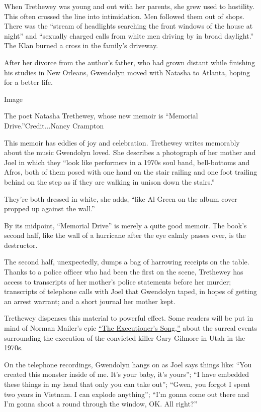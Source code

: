 When Trethewey was young and out with her parents, she grew used to
hostility. This often crossed the line into intimidation. Men followed
them out of shops. There was the ``stream of headlights searching the
front windows of the house at night'' and ``sexually charged calls from
white men driving by in broad daylight.'' The Klan burned a cross in the
family's driveway.

After her divorce from the author's father, who had grown distant while
finishing his studies in New Orleans, Gwendolyn moved with Natasha to
Atlanta, hoping for a better life.

Image

The poet Natasha Trethewey, whose new memoir is ``Memorial
Drive.''Credit...Nancy Crampton

This memoir has eddies of joy and celebration. Trethewey writes
memorably about the music Gwendolyn loved. She describes a photograph of
her mother and Joel in which they ``look like performers in a 1970s soul
band, bell-bottoms and Afros, both of them posed with one hand on the
stair railing and one foot trailing behind on the step as if they are
walking in unison down the stairs.''

They're both dressed in white, she adds, ``like Al Green on the album
cover propped up against the wall.''

By its midpoint, ``Memorial Drive'' is merely a quite good memoir. The
book's second half, like the wall of a hurricane after the eye calmly
passes over, is the destructor.

The second half, unexpectedly, dumps a bag of harrowing receipts on the
table. Thanks to a police officer who had been the first on the scene,
Trethewey has access to transcripts of her mother's police statements
before her murder; transcripts of telephone calls with Joel that
Gwendolyn taped, in hopes of getting an arrest warrant; and a short
journal her mother kept.

Trethewey dispenses this material to powerful effect. Some readers will
be put in mind of Norman Mailer's epic
\href{https://archive.nytimes3xbfgragh.onion/www.nytimes3xbfgragh.onion/books/97/05/04/reviews/mailer-song.html}{``The
Executioner's Song,''} about the surreal events surrounding the
execution of the convicted killer Gary Gilmore in Utah in the 1970s.

On the telephone recordings, Gwendolyn hangs on as Joel says things
like: ``You created this monster inside of me. It's your baby, it's
yours''; ``I have embedded these things in my head that only you can
take out''; ``Gwen, you forgot I spent two years in Vietnam. I can
explode anything''; ``I'm gonna come out there and I'm gonna shoot a
round through the window, OK. All right?''


